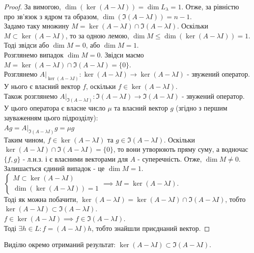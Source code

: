 \begin{proof}
За вимогою, $\dim (\ker(A - \lambda I)) = \dim L_{\lambda} = 1$. Отже, за рівністю про зв'язок з ядром та образом, $\dim (\Im (A - \lambda I)) = n-1$.\\
Задамо таку множину $M=\ker(A-\lambda I) \cap \Im(A-\lambda I)$. Оскільки $M \subset \ker (A-\lambda I)$, то за одною лемою, $\dim M \leq \dim(\ker (A-\lambda I)) = 1$.
Тоді звідси або $\dim M = 0$, або $\dim M = 1$.
\bigskip \\
Розглянемо випадок $\dim M = 0$. Звідси маємо $M = \ker(A-\lambda I) \cap \Im(A-\lambda I) = \{0\}$.\\
Розглянемо $A |_{\ker(A-\lambda I)}: \ker(A-\lambda I) \to \ker(A-\lambda I)$ - звужений оператор. У нього є власний вектор $f$, оскільки $f \in \ker (A-\lambda I)$.\\
Також розглянемо $A |_{\Im(A-\lambda I)}: \Im(A-\lambda I) \to \Im(A-\lambda I)$ - звужений оператор. У цього оператора є власне число $\mu$ та власний вектор $g$ (згідно з першим зауваженням цього підрозділу):\\
$Ag = A |_{\Im(A-\lambda I)} g = \mu g$\\
Таким чином, $f \in \ker(A-\lambda I)$ та $g \in \Im(A-\lambda I)$. Оскільки $\ker ( A-\lambda I ) \cap \Im ( A - \lambda I ) = \{ 0 \}$, то вони утворюють пряму суму, а водночас $\{f,g\}$ - л.н.з. і є власними векторами для $A$ - суперечність. Отже, $\dim M \neq 0$.
\bigskip \\
Залишається єдиний випадок - це $\dim M = 1$.\\
$\begin{cases}
M \subset \ker(A-\lambda I)\\
\dim{(\ker(A-\lambda I))} = 1
\end{cases}
\implies M = \ker(A-\lambda I)$.
\bigskip \\
Тоді як можна побачити, $\ker(A-\lambda I) = \ker(A-\lambda I) \cap \Im (A - \lambda I)$, тобто $\ker(A-\lambda I) \subset \Im(A-\lambda I)$.\\
$f \in \ker (A- \lambda I) \implies f \in \Im(A - \lambda I)$.\\
Тоді $\exists h \in L: f = (A-\lambda I)h$, тобто знайшли приєднаний вектор.
\end{proof}

\begin{corollary}
Виділю окремо отриманий результат: $\ker (A-\lambda I) \subset \Im (A - \lambda I)$.
\end{corollary}

